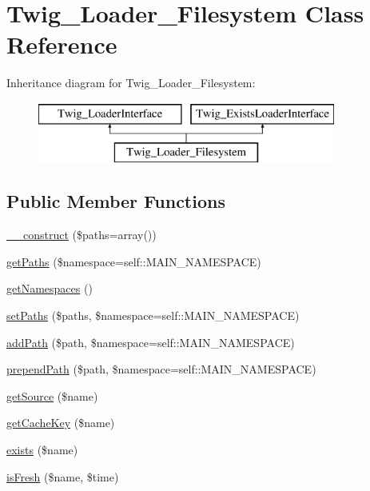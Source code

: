 \hypertarget{class_twig___loader___filesystem}{}\section{Twig\+\_\+\+Loader\+\_\+\+Filesystem Class Reference}
\label{class_twig___loader___filesystem}
Inheritance diagram for Twig\+\_\+\+Loader\+\_\+\+Filesystem\+:\begin{figure}[H]
\begin{center}
\leavevmode
\includegraphics[height=2.000000cm]{class_twig___loader___filesystem}
\end{center}
\end{figure}
\subsection*{Public Member Functions}
\begin{DoxyCompactItemize}
\item 
\hyperlink{class_twig___loader___filesystem_a83e29a1e62ec06af26802d3ed070ffc3}{\+\_\+\+\_\+construct} (\$paths=array())
\item 
\hyperlink{class_twig___loader___filesystem_a8521d3d613a29e60cc1bfdf4b85bba75}{get\+Paths} (\$namespace=self\+::\+M\+A\+I\+N\+\_\+\+N\+A\+M\+E\+S\+P\+A\+C\+E)
\item 
\hyperlink{class_twig___loader___filesystem_ae4c74dabb3e9ba4103ffd4e8febcac21}{get\+Namespaces} ()
\item 
\hyperlink{class_twig___loader___filesystem_a7e388aa6a6e5cce6b57ff23c154860b1}{set\+Paths} (\$paths, \$namespace=self\+::\+M\+A\+I\+N\+\_\+\+N\+A\+M\+E\+S\+P\+A\+C\+E)
\item 
\hyperlink{class_twig___loader___filesystem_a758f4df0ca7ea3ac2802742ac202951f}{add\+Path} (\$path, \$namespace=self\+::\+M\+A\+I\+N\+\_\+\+N\+A\+M\+E\+S\+P\+A\+C\+E)
\item 
\hyperlink{class_twig___loader___filesystem_a22161c5fd7e03e040c8f0aaa493f6867}{prepend\+Path} (\$path, \$namespace=self\+::\+M\+A\+I\+N\+\_\+\+N\+A\+M\+E\+S\+P\+A\+C\+E)
\item 
\hyperlink{class_twig___loader___filesystem_a8c6017d8ed0800a8d6b201883fcfb4bd}{get\+Source} (\$name)
\item 
\hyperlink{class_twig___loader___filesystem_aaf1587bcc7c8f06e87be6ccaf76fb6ea}{get\+Cache\+Key} (\$name)
\item 
\hyperlink{class_twig___loader___filesystem_a0909de156d39accf2e3c52f4bce3765f}{exists} (\$name)
\item 
\hyperlink{class_twig___loader___filesystem_a3ee0419b212dc4f6f1e8a5a615423ad8}{is\+Fresh} (\$name, \$time)
\end{DoxyCompactItemize}
